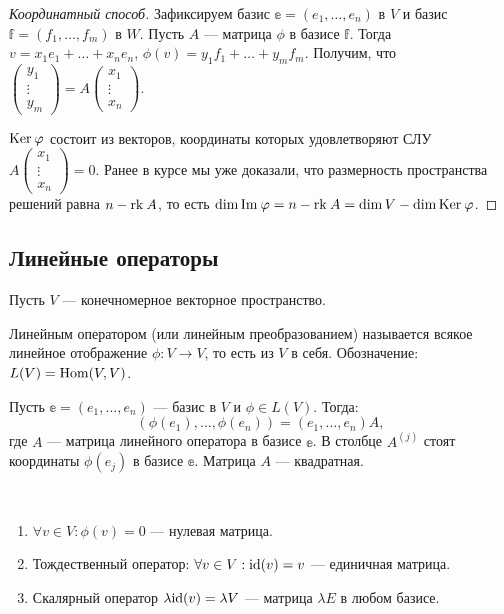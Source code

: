 \begin{proof}[Координатный способ]
    Зафиксируем базис $\mathbb{e} = (e_1, \ldots, e_n)$ в $V$ и базис $\mathbb{f} = (f_1, \ldots, f_m)$ в $W$. Пусть $A$ --- матрица $\phi$ в базисе $\mathbb{f}$. Тогда $v = x_1e_1 + \ldots + x_ne_n$, $\phi(v) = y_1f_1 + \ldots + y_mf_m$. Получим, что $\begin{pmatrix} y_1\\ \vdots \\ y_m \end{pmatrix} = A \begin{pmatrix} x_1\\ \vdots \\ x_n\end{pmatrix}$. 
    
    $\mathrm{Ker}\: \varphi$ состоит из векторов, координаты которых удовлетворяют СЛУ $ A \begin{pmatrix} x_1\\ \vdots \\ x_n\end{pmatrix} = 0$. Ранее в курсе мы уже доказали, что размерность пространства решений равна $n - \mathrm{rk}\: A$, то есть $\dim \mathrm{Im\:} \varphi = n - \mathrm{rk}\: A = \dim V - \dim \mathrm{Ker}\: \varphi$.
\end{proof}

\subsection{Линейные операторы}

Пусть $V$ --- конечномерное векторное пространство.

\begin{Def}
    Линейным оператором (или линейным преобразованием) называется всякое линейное отображение $\phi \colon V \rightarrow V$, то есть из $V$ в себя. Обозначение: $L(V) = \mathrm{Hom}(V, V)$.
\end{Def}

\par Пусть $\mathbb{e} = (e_1, \ldots, e_n)$ --- базис в $V$ и $\phi \in L(V)$. Тогда:
$$
\left(\phi(e_1), \ldots, \phi(e_n)\right) = \left(e_1, \ldots, e_n\right)A,
$$
где $A$ --- матрица линейного оператора в базисе $\mathbb{e}$. В столбце $A^{\left( j\right)}$ стоят координаты $\phi(e_j)$ в базисе $\mathbb{e}$. Матрица $A$ --- квадратная. 
\begin{Examples}\
    \begin{enumerate}
        \item $\forall v \in V : \phi(v) = 0$ --- нулевая матрица.
        \item Тождественный оператор: $\forall v \in V : \mathrm{id}(v) = v$ --- единичная матрица.
        \item Скалярный оператор $\lambda \mathrm{id}(v) = \lambda V$ --- матрица $\lambda E$ в любом базисе.
    \end{enumerate}
\end{Examples}

